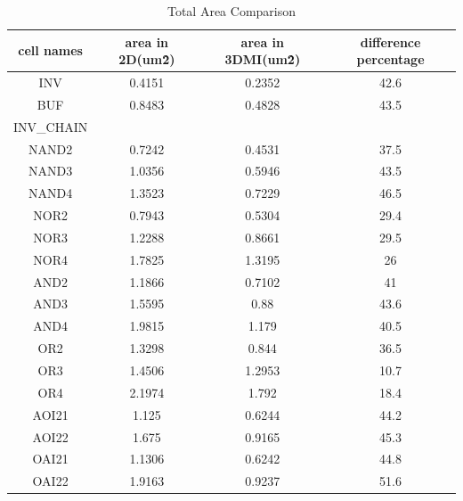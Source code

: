 \documentclass{article}
\begin{document}
\begin{table}
\centering
\begin{tabular}{|c|c|c|c|} 
\hline
cell names&area in 2D(um\^2)&area in 3DMI(um\^2)&difference percentage \\ \hline
INV&0.4151&0.2352&42.6\\ \hline
BUF&0.8483&0.4828&43.5\\ \hline
INV\_CHAIN&&& \\ \hline
NAND2&0.7242&0.4531&37.5\\ \hline
NAND3&1.0356&0.5946&43.5\\ \hline
NAND4&1.3523&0.7229&46.5\\ \hline
NOR2&0.7943&0.5304&29.4\\ \hline
NOR3&1.2288&0.8661&29.5\\ \hline
NOR4&1.7825&1.3195&26\\ \hline
AND2&1.1866&0.7102&41\\ \hline
AND3&1.5595&0.88&43.6\\ \hline
AND4&1.9815&1.179&40.5\\ \hline
OR2&1.3298&0.844&36.5\\ \hline
OR3&1.4506&1.2953&10.7\\ \hline
OR4&2.1974&1.792&18.4\\ \hline
AOI21&1.125&0.6244&44.2\\ \hline
AOI22&1.675&0.9165&45.3\\ \hline
OAI21&1.1306&0.6242&44.8\\ \hline
OAI22&1.9163&0.9237&51.6\\ \hline
\end{tabular}
\label{tab:nmos_area}
\caption{Total Area Comparison}
\end{table}
\end{document}
